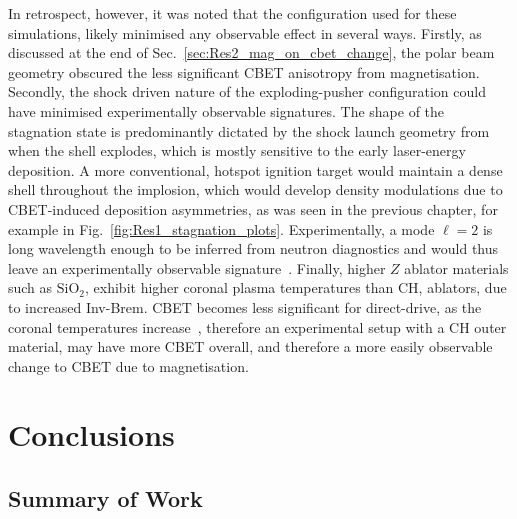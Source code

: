 In retrospect, however, it was noted that the configuration used for these simulations, likely minimised any observable effect in several ways.
Firstly, as discussed at the end of Sec.~\ref{sec:Res2_mag_on_cbet_change}, the polar beam geometry obscured the less significant \ac{CBET} anisotropy from magnetisation.
Secondly, the shock driven nature of the exploding-pusher configuration could have minimised experimentally observable signatures.
The shape of the stagnation state is predominantly dictated by the shock launch geometry from when the shell explodes, which is mostly sensitive to the early laser-energy deposition.
A more conventional, hotspot ignition target would maintain a dense shell throughout the implosion, which would develop density modulations due to \ac{CBET}-induced deposition asymmetries, as was seen in the previous chapter, for example in Fig.~\ref{fig:Res1_stagnation_plots}.
Experimentally, a mode $\ell=2$ is long wavelength enough to be inferred from neutron diagnostics and would thus leave an experimentally observable signature~\cite{woo_inferring_2020,casey_three_2024}.
Finally, higher $Z$ ablator materials such as $\text{SiO}_2$, exhibit higher coronal plasma temperatures than CH, ablators, due to increased \ac{Inv-Brem}.
\ac{CBET} becomes less significant for direct-drive, as the coronal temperatures increase~\cite{colaitis_exploration_2023}, therefore an experimental setup with a CH outer material, may have more \ac{CBET} overall, and therefore a more easily observable change to \ac{CBET} due to magnetisation.

\section{Conclusions}%
\label{sec:Res2_conclusions}



\subsection{Summary of Work}%
\label{sec:Res2_summary}

